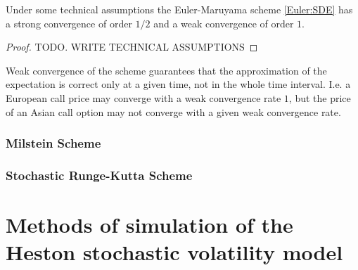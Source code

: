                 \begin{theorem}
                    Under some technical assumptions the Euler-Maruyama scheme \eqref{Euler:SDE} has a strong convergence 
                    of order $1/2$ and a weak convergence of order $1$.
                \end{theorem}
                \begin{proof}
                    {\color{red}TODO. WRITE TECHNICAL ASSUMPTIONS}
                \end{proof}
            
                \begin{remark}
                    Weak convergence of the scheme guarantees that the approximation of the expectation is correct only 
                    at a given time, not in the whole time interval. I.e. a European call price may converge with a weak 
                    convergence rate $1$, but the price of an Asian call option may not converge with a given weak 
                    convergence rate.
                \end{remark}

            \subsection{Milstein Scheme}

            \subsection{Stochastic Runge-Kutta Scheme}
                

\chapter{Methods of simulation of the Heston stochastic volatility model}
